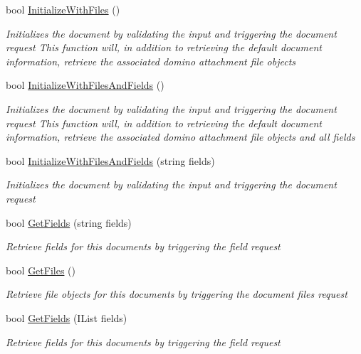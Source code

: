 \begin{DoxyCompactItemize}
bool \mbox{\hyperlink{class_document_object_a83f0e855adc5fb7afd02d2e34767f5c8}{Initialize\+With\+Files}} ()
\begin{DoxyCompactList}\small\item\em Initializes the document by validating the input and triggering the document request This function will, in addition to retrieving the default document information, retrieve the associated domino attachment file objects \end{DoxyCompactList}\item 
bool \mbox{\hyperlink{class_document_object_a16350c0f471c95c82b418b7f1dc53694}{Initialize\+With\+Files\+And\+Fields}} ()
\begin{DoxyCompactList}\small\item\em Initializes the document by validating the input and triggering the document request This function will, in addition to retrieving the default document information, retrieve the associated domino attachment file objects and all fields \end{DoxyCompactList}\item 
bool \mbox{\hyperlink{class_document_object_af68a4510477845f4a1dce889bab7ed2f}{Initialize\+With\+Files\+And\+Fields}} (string fields)
\begin{DoxyCompactList}\small\item\em Initializes the document by validating the input and triggering the document request \end{DoxyCompactList}\item 
bool \mbox{\hyperlink{class_document_object_a8883fec3b5b1b6e2e43f4b5ca4092684}{Get\+Fields}} (string fields)
\begin{DoxyCompactList}\small\item\em Retrieve fields for this documents by triggering the field request \end{DoxyCompactList}\item 
bool \mbox{\hyperlink{class_document_object_a2c8aee9450e8fdd1e84e8ff26d0950a1}{Get\+Files}} ()
\begin{DoxyCompactList}\small\item\em Retrieve file objects for this documents by triggering the document files request \end{DoxyCompactList}\item 
bool \mbox{\hyperlink{class_document_object_a8e38704e02850b2480d29d184ae2c0e0}{Get\+Fields}} (I\+List fields)
\begin{DoxyCompactList}\small\item\em Retrieve fields for this documents by triggering the field request \end{DoxyCompactList}\item 

\end{DoxyCompactItemize}
